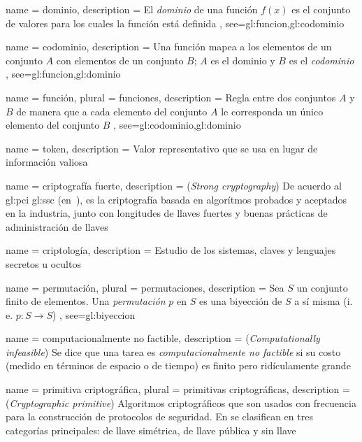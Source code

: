 {
  name = dominio,
  description = {
    El \textit{dominio} de una función $f(x)$ es el conjunto de
    valores para los cuales la función está definida%
  },
  see={gl:funcion,gl:codominio}
}

{
  name = codominio,
  description = {
    Una función mapea a los elementos de un conjunto $A$ con elementos
    de un conjunto $B$; $A$ es el dominio y $B$ es el
    \textit{codominio}%
  },
  see={gl:funcion,gl:dominio}
}

{
  name = función,
  plural = funciones,
  description = {
    Regla entre dos conjuntos $A$ y $B$ de manera que a cada elemento del
    conjunto $A$ le corresponda un único elemento del conjunto $B$%
  },
  see={gl:codominio,gl:dominio}
}

{
  name = token,
  description = {
    Valor representativo que se usa en lugar de información valiosa%
  }
}

{
  name = criptografía fuerte,
  description = {
    (\textit{Strong cryptography}) De acuerdo al \gls{gl:pci} \gls{gl:ssc}
    (en~\cite{dss_glosario}), es la criptografía basada en algorítmos probados
    y aceptados en la industria, junto con longitudes de llaves fuertes y
    buenas prácticas de administración de llaves%
  }
}

{
  name = criptología,
  description = {
    Estudio de los sistemas, claves y lenguajes secretos u ocultos%
  }
}

{
  name = permutación,
  plural = permutaciones,
  description = {
    Sea $ S $ un conjunto finito de elementos. Una \textit{permutación} $ p $
    en $ S $ es una biyección de $ S $ a sí misma (i. e.
    $ p: S \rightarrow S $)%
  },
  see={gl:biyeccion}
}

{
  name = computacionalmente no factible,
  description = {
    (\textit{Computationally infeasible}) Se dice que una tarea es
    \textit{computacionalmente no factible} si su costo (medido en términos de
    espacio o de tiempo) es finito pero ridículamente grande%
  }
}

{
  name = primitiva criptográfica,
  plural = primitivas criptográficas,
  description = {
    (\textit{Cryptographic primitive}) Algoritmos criptográficos que son usados
    con frecuencia para la construcción de protocolos de seguridad. En
    \cite{menezes} se clasifican en tres categorías principales: de llave
    simétrica, de llave pública y sin llave%
  }
}

